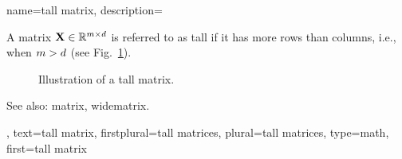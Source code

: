 {name={tall matrix},
	description={A \gls{matrix} ${\bf X} \in \mathbb{R}^{m \times d}$ 
		is referred to as tall if it has more rows than columns, i.e., 
		when $m > d$ (see Fig.\ \ref{fig_tallmatrix_dict}).
		\begin{figure}[H]
			\centering
		\caption{Illustration of a tall \gls{matrix}. \label{fig_tallmatrix_dict}}
		\end{figure}
		See also: \gls{matrix}, \gls{widematrix}. },
	text={tall matrix}, 
	firstplural={tall matrices}, 
	plural={tall matrices}, 
	type=math,
   	first={tall matrix} 
}

